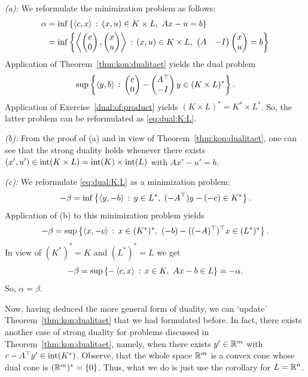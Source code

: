 \begin{solution} 
	\emph{(a):} We reformulate the minimization problem as follows:
	\begin{align*}
		\alpha & = \inf \left\{  \left\langle c , x \right\rangle  \,:\,  (x,u) \in K \times L, \ A x - u = b \right\}
		\\ & = \inf \left\{  \left\langle \begin{pmatrix} c \\ 0 \end{pmatrix}  ,  \begin{pmatrix} x \\ u \end{pmatrix}  \right\rangle  \,:\,  (x,u) \in K \times L, \ \begin{pmatrix} A & -I \end{pmatrix} \begin{pmatrix} x \\ u \end{pmatrix} = b \right\}
	\end{align*}
	Application of Theorem~\ref{thm:kon:dualitaet} yields the dual problem
	\[
		\sup \left\{ \left\langle y , b \right\rangle \,:\,  \begin{pmatrix}c\\ 0 \end{pmatrix} - \begin{pmatrix} A^\top \\ - I \end{pmatrix} y  \in (K \times L)^\ast \right\}.
	\]
	Application of Exercise~\ref{dual:of:product} yields $(K \times L)^\ast = K^\ast \times L^\ast$.
	 So, the latter problem can be reformulated as \eqref{eq:dual:K:L}.
	 
	\emph{(b):} From the proof of (a) and in view of  Theorem~\ref{thm:kon:dualitaet}, one can see that the strong duality holds whenever there exists $(x',u') \in \operatorname{int}(K \times L) = \operatorname{int}(K) \times \operatorname{int}(L)$ with $Ax' - u' =b$.

	\emph{(c):} We reformulate \eqref{eq:dual:K:L} as a minimization problem:
	\[
		-\beta = \inf \left\{ \left\langle y , -b \right\rangle \,:\, y \in L^\ast, \ (-A^\top) y - (-c) \in K^\ast \right\}.
	\]
	Application of (b) to this minimization problem yields
	\[
		- \beta = \sup \left\{ \left\langle x , -c \right\rangle \,:\, x \in (K^\ast)^\ast,  \ (-b) - ((-A)^\top)^\top x  \in (L^\ast)^\ast  \right\}.
	\]
	In view of $(K^\ast)^\ast = K$ and $(L^\ast)^\ast = L$ we get
	\[
		- \beta = \sup \left\{  - \left\langle c , x \right\rangle  \,:\, x \in K, \ A x - b \in L \right\} = - \alpha.
	\]
	So, $\alpha = \beta$. 
\end{solution}

\begin{remark}
	Now, having deduced the more general form of duality, we can `update'  Theorem~\ref{thm:kon:dualitaet} that we had formulated before. In fact, there exists another case of strong duality for problems discussed in Theorem~\ref{thm:kon:dualitaet}, namely, when there exists $y' \in \mathbb{R}^m$ with $c - A^\top y'\in \operatorname{int}(K^\ast)$. Observe, that the whole space $\mathbb{R}^m$ is a convex cone whose dual cone is $(\mathbb{R}^m)^\ast = \{0\}$. Thus, what we do is just use the corollary for $L=\mathbb{R}^n$. 
\end{remark} 

